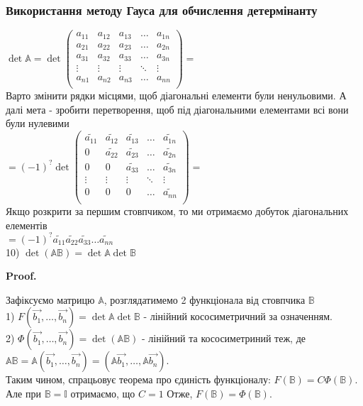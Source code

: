 \documentclass[a4paper, 10pt]{article}
\makeatletter
\def\qed{$\blacksquare$}
\theoremstyle{theoremdd}
\theoremstyle{theoremdd}
\theoremstyle{theoremdd}
\theoremstyle{theoremdd}
\theoremstyle{theoremdd}
\theoremstyle{theoremdd}
\theoremstyle{theoremdd}
\theoremstyle{theoremdd}
\renewenvironment{proof}[1][Proof.\\]{\par
\pushQED{\hfill \qed}%
\normalfont \topsep6\p@\@plus6\p@\relax
\trivlist
\item\relax
{\bfseries
#1\@addpunct{.}}\hspace\labelsep\ignorespaces
}{%
\popQED\endtrivlist\@endpefalse
}
\makeatother
\begin{document}
\subsubsection*{Використання методу Гауса для обчислення детермінанту}
$\det \mathbb{A} = \det \begin{pmatrix} 
a_{11} & a_{12} & a_{13} & \dots & a_{1n} \\
a_{21} & a_{22} & a_{23} & \dots & a_{2n} \\
a_{31} & a_{32} & a_{33} & \dots & a_{3n} \\
\vdots & \vdots & \vdots & \ddots & \vdots \\
a_{n1} & a_{n2} & a_{n3} & \dots & a_{nn} \\
\end{pmatrix} = $\\
Варто змінити рядки місцями, щоб діагональні елементи були ненульовими. А далі мета - зробити перетворення, щоб під діагональними елементами всі вони були нулевими\\
$= (-1)^? \det \begin{pmatrix} 
\tilde{a_{11}} & \tilde{a_{12}} & \tilde{a_{13}} & \dots & \tilde{a_{1n}} \\
0 & \tilde{a_{22}} & \tilde{a_{23}} & \dots & \tilde{a_{2n}} \\
0 & 0 & \tilde{a_{33}} & \dots & \tilde{a_{3n}} \\
\vdots & \vdots & \vdots & \ddots & \vdots \\
0 & 0 & 0 & \dots & \tilde{a_{nn}} \\
\end{pmatrix} = $\\
Якщо розкрити за першим стовпчиком, то ми отримаємо добуток діагональних елементів\\
$ = (-1)^? \tilde{a_{11}}\tilde{a_{22}}\tilde{a_{33}}\dots \tilde{a_{nn}}$
\bigskip \\
10) $\det (\mathbb{A} \mathbb{B}) = \det \mathbb{A} \det \mathbb{B}$
\begin{proof}
Зафіксуємо матрицю $\mathbb{A}$, розглядатимемо 2 функціонала від стовпчика $\mathbb{B}$\\
1) $F(\vec{b_1},\dots, \vec{b_n}) = \det \mathbb{A} \det \mathbb{B}$ - лінійний кососиметричний за означенням.\\
2) $\Phi(\vec{b_1},\dots, \vec{b_n}) = \det(\mathbb{A}\mathbb{B})$ - лінійний та кососиметриний теж, де $\mathbb{A}\mathbb{B} = \mathbb{A}(\vec{b_1},\dots, \vec{b_n}) = (\mathbb{A}\vec{b_1},\dots, \mathbb{A}\vec{b_n})$.\\
Таким чином, спрацьовує теорема про єдиність функціоналу: $F(\mathbb{B}) = C \Phi(\mathbb{B})$.\\
Але при $\mathbb{B} = \mathbb{I}$ отримаємо, що $C=1$ Отже, $F(\mathbb{B}) = \Phi(\mathbb{B})$.
\end{proof}
\end{document}
